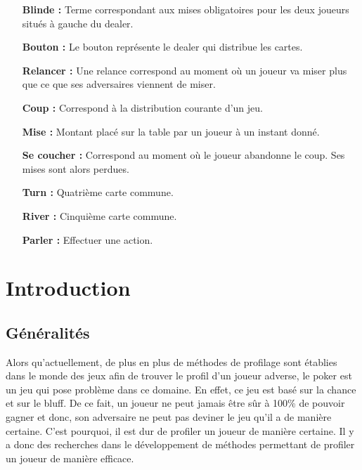 \documentclass{report}
\begin{document}
\begin{itemize}
		\item[\textbf{Blinde : }]Terme correspondant aux mises obligatoires pour les deux joueurs situés à gauche du dealer.\medskip
		
		\item[\textbf{Bouton : }]Le bouton représente le dealer qui distribue les cartes.\medskip
		
		\item[\textbf{Relancer : }]Une relance correspond au moment où un joueur va miser plus que ce que ses adversaires viennent de miser.\medskip
		
		\item[\textbf{Coup : }]Correspond à la distribution courante d'un jeu.\medskip
		
		\item[\textbf{Mise : }]Montant placé sur la table par un joueur à un instant donné.\medskip
		
		\item[\textbf{Se coucher : }]Correspond au moment où le joueur abandonne le coup. Ses mises sont alors perdues.\medskip
		
		\item[\textbf{Turn : }]Quatrième carte commune.\medskip
		
		\item[\textbf{River : }]Cinquième carte commune.\medskip
		
		\item[\textbf{Parler :}]Effectuer une action.\medskip
		
\end{itemize}



\chapter{Introduction}

\section{Généralités}
\hspace{0.5cm}Alors qu'actuellement, de plus en plus de méthodes de profilage sont établies dans le monde des jeux afin de trouver le profil d'un joueur adverse, le poker est un jeu qui pose problème dans ce domaine. En effet, ce jeu est basé sur la chance et sur le bluff. De ce fait, un joueur ne peut jamais être sûr à 100\% de pouvoir gagner et donc, son adversaire ne peut pas deviner le jeu qu'il a de manière certaine. C'est pourquoi, il est dur de profiler un joueur de manière certaine. Il y a donc des recherches dans le développement de méthodes permettant de profiler un joueur de manière efficace. \par
\end{document}
